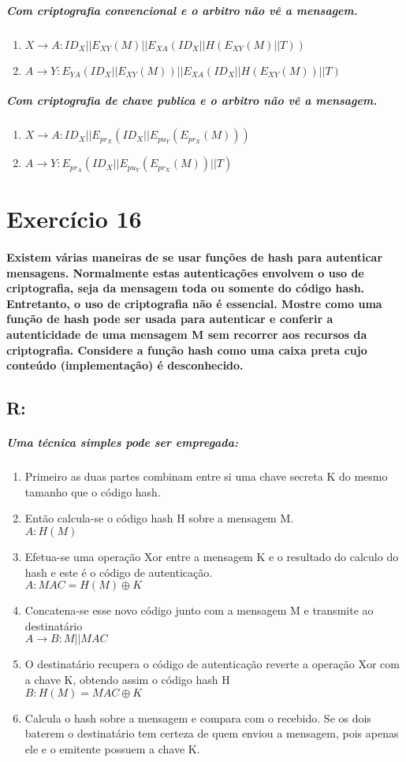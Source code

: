 \documentclass[10pt,a4paper]{report}
\begin{document}
\subparagraph{Com criptografia convencional e o arbitro não vê a mensagem. }
\begin{enumerate}
\item $X \rightarrow A: ID_X||E_{XY}(M)||E_{XA}(ID_X||H(E_{XY}(M)||T))$
\item $A \rightarrow Y: E_{YA}(ID_X||E_{XY}(M))||E_{XA}(ID_X||H(E_{XY}(M))||T)$
\end{enumerate}

\subparagraph{Com criptografia de chave publica e o arbitro não vê a mensagem. }
\begin{enumerate}
\item $X \rightarrow A: ID_X||E_{pr_X}(ID_X||E_{pu_Y}(E_{pr_X}(M)))$
\item $A \rightarrow Y: E_{pr_A}(ID_X||E_{pu_Y}(E_{pr_X}(M))||T)$
\end{enumerate}

\section*{Exercício 16}
\paragraph{Existem várias maneiras de se usar funções de hash para autenticar mensagens. Normalmente estas autenticações envolvem o uso de criptografia, seja da mensagem toda ou somente do código hash. Entretanto, o uso de criptografia não é essencial. Mostre como uma função de hash pode ser usada para autenticar e conferir a autenticidade de uma mensagem M sem recorrer aos recursos da criptografia. Considere a função hash como uma caixa preta cujo conteúdo (implementação) é desconhecido.}
\subsection*{R:}
\subparagraph{Uma técnica simples pode ser empregada:}
\begin{enumerate}[(1)]
\item  Primeiro as duas partes combinam entre si uma chave secreta K do mesmo tamanho que o código hash.
\item Então calcula-se o código hash H sobre a mensagem M.
\\ $A: H(M)$
\item Efetua-se uma operação Xor entre a mensagem K e o resultado do calculo do hash e este é o código de autenticação.
\\ $A:MAC = H(M) \oplus K$
\item Concatena-se esse novo código junto com a mensagem M e transmite ao destinatário
\\ $A \rightarrow B: M||MAC$
\item O destinatário recupera o código de autenticação reverte a operação Xor com a chave K, obtendo assim o código hash H
\\ $B:H(M) = MAC \oplus K $
\item Calcula o hash sobre a mensagem e compara com o recebido. Se os dois baterem o destinatário tem certeza de quem enviou a mensagem, pois apenas ele e o emitente possuem a chave K.
\end{enumerate}
\end{document}
